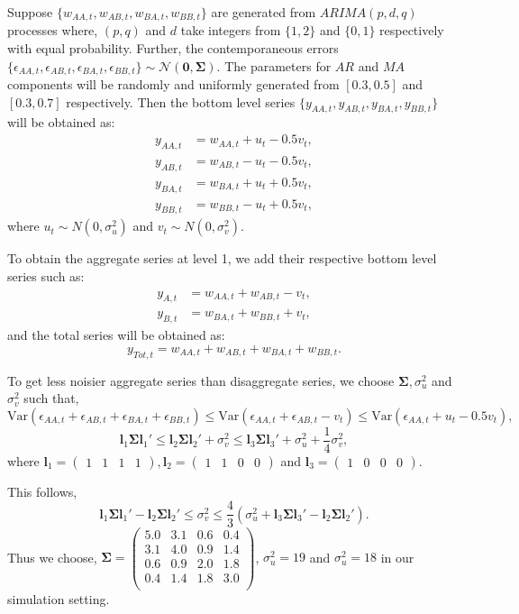 \documentclass[a4paper, 11pt]{article}
\begin{document}
Suppose $\{w_{AA,t},w_{AB,t},w_{BA,t},w_{BB,t}\}$ are generated from $ARIMA(p,d,q)$ processes where, $(p,q)$ and $d$ take integers from $\{1,2\}$ and $\{0,1\}$ respectively with equal probability. Further, the contemporaneous errors $\{\epsilon_{AA,t},\epsilon_{AB,t},\epsilon_{BA,t},\epsilon_{BB,t}\} \sim \mathcal{N}(\bm{0}, \bm{\Sigma})$. The parameters for $AR$ and $MA$ components will be randomly and uniformly generated from $[0.3,0.5]$ and $[0.3,0.7]$ respectively. Then the bottom level series $\{y_{AA,t},y_{AB,t},y_{BA,t},y_{BB,t}\}$ will be obtained as:
\begin{align*}
y_{AA,t} &= w_{AA,t} + u_t - 0.5v_t,\\
y_{AB,t} &= w_{AB,t} - u_t - 0.5v_t,\\
y_{BA,t} &= w_{BA,t} + u_t + 0.5v_t,\\
y_{BB,t} &= w_{BB,t} - u_t + 0.5v_t,
\end{align*}
where $u_t \sim N(0,\sigma^2_u)$ and $v_t \sim N(0,\sigma^2_v)$.

To obtain the aggregate series at level 1, we add their respective bottom level series such as:
\begin{align*}
y_{A,t} &= w_{AA,t} + w_{AB,t} - v_t,\\
y_{B,t} &= w_{BA,t} + w_{BB,t} + v_t,
\end{align*}
and the total series will be obtained as:
$$y_{Tot,t} = w_{AA,t} + w_{AB,t} + w_{BA,t} + w_{BB,t}.$$

To get less noisier aggregate series than disaggregate series, we choose $\bm{\Sigma}, \sigma^2_u$ and $\sigma^2_v$ such that,
$$
\text{Var}(\epsilon_{AA,t}+\epsilon_{AB,t}+\epsilon_{BA,t}+\epsilon_{BB,t}) \le \text{Var}(\epsilon_{AA,t}+\epsilon_{AB,t}-v_t) \le \text{Var}(\epsilon_{AA,t}+u_t-0.5v_t),
$$
$$
\bm{l}_1\bm{\Sigma} \bm{l}_1' \le \bm{l}_2\bm{\Sigma} \bm{l}_2' + \sigma^2_v \le  \bm{l}_3\bm{\Sigma} \bm{l}_3' + \sigma^2_u + \frac{1}{4}\sigma^2_v,
$$
where $\bm{l}_1 = \begin{pmatrix} 1&1&1&1 \end{pmatrix}, \bm{l}_2 = \begin{pmatrix} 1&1&0&0 \end{pmatrix}$ and $\bm{l}_3 = \begin{pmatrix} 1&0&0&0 \end{pmatrix}$.

This follows,
$$\bm{l}_1\bm{\Sigma} \bm{l}_1' - \bm{l}_2\bm{\Sigma} \bm{l}_2' \le \sigma^2_v \le \frac{4}{3}(\sigma^2_u + \bm{l}_3\bm{\Sigma} \bm{l}_3' - \bm{l}_2\bm{\Sigma} \bm{l}_2').$$
Thus we choose,
$\bm{\Sigma} =
\begin{pmatrix}
5.0 & 3.1 & 0.6 & 0.4 \\
3.1 & 4.0 & 0.9 & 1.4 \\
0.6 & 0.9 & 2.0 & 1.8 \\
0.4 & 1.4 & 1.8 & 3.0 \\
\end{pmatrix}$,
$\sigma^2_u = 19$ and $\sigma^2_u = 18$ in our simulation setting.
\end{document}

